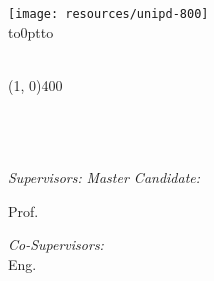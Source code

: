 %


\begin{titlepage}
	\centering	
	
	\texttt{[image: resources/unipd-800]} \\[2mm]
	\vbox to0pt{\vbox to\vss}
	
	\scshape{\huge{{\thesisUniversity}}} \\
	\line(1, 0){400} \\[2mm]


	\textsf{\thesisUniversityDepartment} \\
	\textsf{\thesisUniversityGroup} \\

	\vfill
	{\LARGE \color{ctcolortitle}\textbf{\thesisTitle} \\[10mm]}


	\begin{center}

	\vfill
	\begin{normalsize}
	\begin{flushleft}	  
	  \textit{Supervisors:} \hfill \textit{Master Candidate:}\\
		\vspace{1pt}

		Prof. \Large \thesisFirstSupervisor \hfill {\Large \thesisName} \\

		\vspace{20pt}

		\normalsize \textit{Co-Supervisors:} \\
		\vspace{1pt}
		Eng. \thesisCoSupervisor


\end{flushleft}
\end{normalsize}
\end{center}
\end{titlepage}
